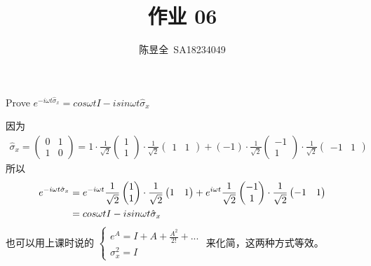 \documentclass[UTF8,12pt]{article} %
\makeatletter
\newenvironment{proof}[1][\protect\proofname]{\par
\normalfont\topsep6\p@\@plus6\p@\relax
\trivlist
\itemindent\parindent
\item[\hskip\labelsep
\scshape
#1]\ignorespaces
}{%
\endtrivlist\@endpefalse
}
\renewcommand{\proofname}{\it{Solution}}
\makeatother
\begin{document}
\title{作业 06}
\author{陈昱全~SA18234049}
\date{} %
\maketitle

\begin{exercise}{}{}
Prove $e^{-i\omega t\hat{\sigma}_{x}}=cos\omega tI-isin\omega t\hat{\sigma}_{x}$
\end{exercise}

\begin{proof}[解]
因为
\begin{align}
\hat{\sigma}_x = \begin{pmatrix}0 & 1 \\ 1 & 0\end{pmatrix} = 1\cdot\frac{1}{\sqrt{2}}\begin{pmatrix}1\\1\end{pmatrix}\cdot\frac{1}{\sqrt{2}}\begin{pmatrix}1&1\end{pmatrix} + (-1)\cdot\frac{1}{\sqrt{2}}\begin{pmatrix}-1\\1\end{pmatrix}\cdot\frac{1}{\sqrt{2}}\begin{pmatrix}-1&1\end{pmatrix}
\end{align}
所以
\begin{align}
e^{-i\omega t\hat{\sigma}_x} &= e^{-i\omega t}\frac{1}{\sqrt{2}}\begin{pmatrix}1\\1\end{pmatrix}\cdot\frac{1}{\sqrt{2}}\begin{pmatrix}1&1\end{pmatrix} + e^{i\omega t}\frac{1}{\sqrt{2}}\begin{pmatrix}-1\\1\end{pmatrix}\cdot\frac{1}{\sqrt{2}}\begin{pmatrix}-1&1\end{pmatrix}\notag\\
&= cos\omega tI-isin\omega t\hat{\sigma}_{x}
\end{align}
也可以用上课时说的 $\begin{cases}e^A = I + A + \frac{A^2}{2!} + ...\\ \sigma_x^2 = I\end{cases}$ 来化简，这两种方式等效。
\end{proof}
\end{document}

